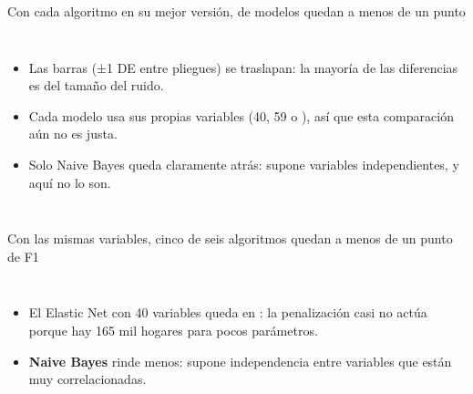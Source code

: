 \begin{frame}{Con cada algoritmo en su mejor versión, \NModelosCerca{} de \NModelosTotal{} modelos quedan a menos de un punto}
  \begin{columns}[T]
    \small
    \begin{itemize}\setlength{\itemsep}{3pt}
      \item Las barras (±1 DE entre pliegues) se traslapan: la mayoría de las diferencias es del tamaño del ruido.
      \item Cada modelo usa sus propias variables (40, 59 o \nNVarsLGBM), así que esta comparación aún no es justa.
      \item Solo Naive Bayes queda claramente atrás: supone variables independientes, y aquí no lo son.
    \end{itemize}
  \end{columns}
\end{frame}

\begin{frame}{Con las mismas variables, cinco de seis algoritmos quedan a menos de un punto de F1}
  \begin{columns}[T]
    \small
    \begin{itemize}\setlength{\itemsep}{3pt}
      \item El Elastic Net con 40 variables queda en \nSPElasticNet{}: la penalización casi no actúa porque hay 165 mil hogares para pocos parámetros.
      \item \textbf{Naive Bayes} rinde menos: supone independencia entre variables que están muy correlacionadas.
    \end{itemize}
  \end{columns}
\end{frame}


